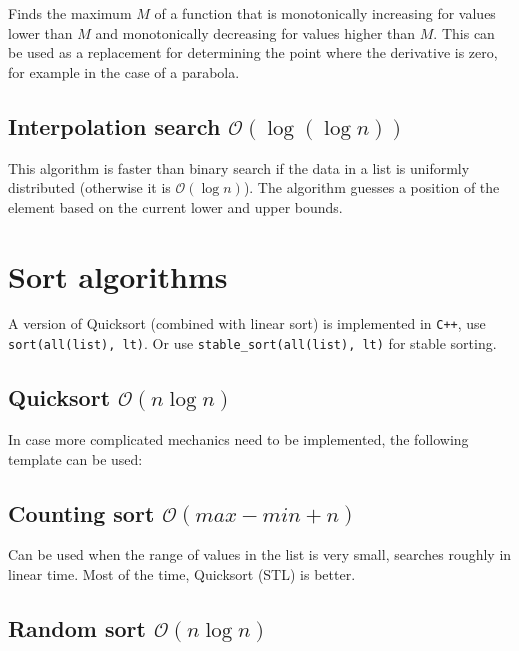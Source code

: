 Finds the maximum $M$ of a function that is monotonically increasing for values lower than $M$ and monotonically decreasing for values higher than $M$. This can be used as a replacement for determining the point where the derivative is zero, for example in the case of a parabola.

\subsection{Interpolation search $\mathcal O(\log(\log n))$}

This algorithm is faster than binary search if the data in a list is uniformly distributed (otherwise it is $\mathcal O(\log n)$). The algorithm guesses a position of the element based on the current lower and upper bounds.





\section{Sort algorithms}

A version of Quicksort (combined with linear sort) is implemented in \texttt{C++}, use \texttt{sort(all(list), lt)}. Or use \texttt{stable\_sort(all(list), lt)} for stable sorting.

\subsection{Quicksort $\mathcal O(n\log n)$}

In case more complicated mechanics need to be implemented, the following template can be used:

\subsection{Counting sort $\mathcal O(max - min + n)$}

Can be used when the range of values in the list is very small, searches roughly in linear time. Most of the time, Quicksort (STL) is better.

\subsection{Random sort $\mathcal O(n\log n)$}


